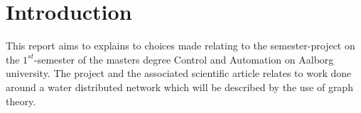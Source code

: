 \section{Introduction}
This report aims to explains to choices made relating to the semester-project on the $1^{st}$-semester of the masters degree Control and Automation on Aalborg university. The project and the associated scientific article relates to work done around a water distributed network which will be described by the use of graph theory.